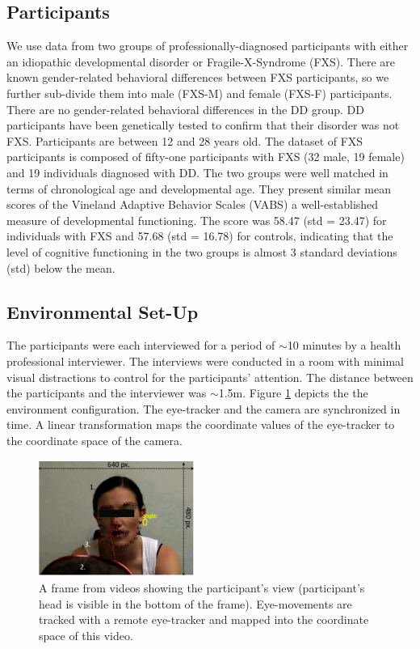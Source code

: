 \documentclass[10pt,twocolumn,letterpaper]{article}
\begin{document}
\subsection{Participants}
We use data from two groups of professionally-diagnosed participants with either an idiopathic developmental disorder or Fragile-X-Syndrome (FXS). There are known gender-related behavioral differences between FXS participants, so we further sub-divide them into male (FXS-M) and female (FXS-F) participants. There are no gender-related behavioral differences in the DD group. DD participants have been genetically tested to confirm that their disorder was not FXS. Participants are between 12 and 28 years old. The dataset of FXS participants is composed of fifty-one participants with FXS (32 male, 19 female) and 19 individuals diagnosed with DD. The two groups were well matched in terms of chronological age and developmental age. They present similar mean scores of the Vineland Adaptive Behavior Scales (VABS) a well-established measure of developmental functioning. The score was 58.47 (std = 23.47) for individuals with FXS and 57.68 (std = 16.78) for controls, indicating that the level of cognitive functioning in the two groups is almost 3 standard deviations (std) below the mean.


\subsection {Environmental Set-Up}
The participants were each interviewed for a period of $\sim$10 minutes by a health professional interviewer. The interviews were conducted in a room with minimal visual distractions to control for the participants' attention. The distance between the participants and the interviewer was $\sim$1.5m. Figure \ref{fig:environment} depicts the the environment configuration. The eye-tracker and the camera are synchronized in time. A linear transformation maps the coordinate values of the eye-tracker to the coordinate space of the camera.  

\begin{figure}[ht]   
 \centering
           \includegraphics[width=2in,height= 1.5in]{figures/Real.png}
 \caption{A frame from videos showing the participant's view (participant's head is visible in the bottom of the frame). Eye-movements are tracked with a remote eye-tracker and mapped into the coordinate space of this video.}
\label{fig:environment}
\end{figure}
\end{document}
